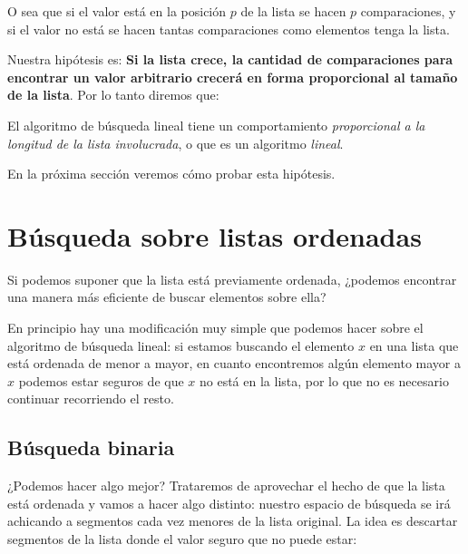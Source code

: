 O sea que si el valor está en la posición $p$ de la lista se hacen $p$
comparaciones, y si el valor no está se hacen tantas comparaciones como
elementos tenga la lista.

Nuestra hipótesis es: {\bf Si la lista crece, la cantidad de comparaciones
para encontrar un valor arbitrario crecerá en forma proporcional al tamaño de
la lista}. Por lo tanto diremos que:

\begin{observacion}
El algoritmo de búsqueda lineal tiene un comportamiento \emph{proporcional a la
longitud de la lista involucrada}, o que es un algoritmo \emph{lineal}.
\end{observacion}

En la próxima sección veremos cómo probar esta hipótesis.

\section{Búsqueda sobre listas ordenadas}

Si podemos suponer que la lista está previamente ordenada,
¿podemos encontrar una manera más eficiente de buscar elementos sobre ella?

En principio hay una modificación muy simple que podemos hacer sobre el
algoritmo de búsqueda lineal: si estamos buscando el elemento $x$ en una
lista que está ordenada de menor a mayor, en cuanto encontremos algún elemento
mayor a $x$ podemos estar seguros de que $x$ no está en la lista, por lo que no
es necesario continuar recorriendo el resto.


\subsection*{Búsqueda binaria}

¿Podemos hacer algo mejor? Trataremos de aprovechar el hecho de que la lista
está ordenada y vamos a hacer algo distinto: nuestro espacio de búsqueda se
irá achicando a segmentos cada vez menores de la lista original.
La idea es descartar segmentos de la lista donde el valor seguro que no puede
estar:

